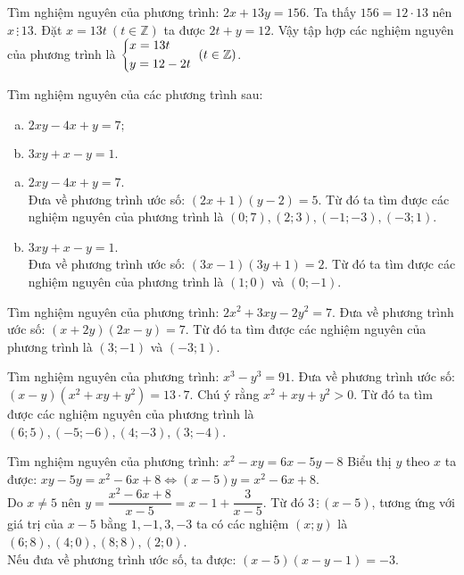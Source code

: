 \begin{bt}
	Tìm nghiệm nguyên của phương trình: $2x+13y = 156$.
	\loigiai
	{
		Ta thấy $156=12 \cdot 13$ nên $x \,\vdots \,13$. Đặt $x = 13t~(t \in \mathbb{Z})$ ta được $2t+y=12$. Vậy tập hợp các nghiệm nguyên của phương trình là $\left\{\begin{aligned}&x=13t \\ &y=12-2t\end{aligned}\right.~(t \in \mathbb{Z})$.
	}
\end{bt}

\begin{bt}
	Tìm nghiệm nguyên của các phương trình sau:
	\begin{multicols}{2}
		\begin{enumerate}[a)]
			\item $2xy-4x+y=7;$
			\item $3xy+x-y=1.$
		\end{enumerate}
	\end{multicols}
	\loigiai 
	{
		\begin{enumerate}[a)]
			\item $2xy-4x+y=7$. \\
			Đưa về phương trình ước số: $(2x+1)(y-2)=5$. Từ đó ta tìm được các nghiệm nguyên của phương trình là $(0;7),(2;3),(-1;-3),(-3;1)$.
			\item $3xy+x-y=1$. \\
			Đưa về phương trình ước số: $(3x-1)(3y+1)=2$. Từ đó ta tìm được các nghiệm nguyên của phương trình là $(1;0)$ và $(0;-1)$.
		\end{enumerate}
	}
\end{bt}

\begin{bt}
	Tìm nghiệm nguyên của phương trình: $2x^2+3xy-2y^2=7$.
	\loigiai 
	{
		Đưa về phương trình ước số: $(x+2y)(2x-y)=7$. Từ đó ta tìm được các nghiệm nguyên của phương trình là $(3;-1)$ và $(-3;1)$.
	}
\end{bt}

\begin{bt}
	Tìm nghiệm nguyên của phương trình: $x^3-y^3=91$.
	\loigiai 
	{
		Đưa về phương trình ước số: $(x-y) \left(x^2+xy+y^2\right) = 13 \cdot 7$. Chú ý rằng $x^2+xy+y^2>0$. Từ đó ta tìm được các nghiệm nguyên của phương trình là $(6;5),(-5;-6),(4;-3),(3;-4)$.
	}
\end{bt}

\begin{bt}
	Tìm nghiệm nguyên của phương trình: $x^2-xy=6x-5y-8$
	\loigiai 
	{
		Biểu thị $y$ theo $x$ ta được: $xy-5y=x^2-6x+8 \Leftrightarrow (x-5)y=x^2-6x+8$. \\
		Do $x \neq 5$ nên $y = \dfrac{x^2-6x+8}{x-5} = x-1+\dfrac{3}{x-5}$. Từ đó $3 \,\vdots\, (x-5)$, tương ứng với giá trị của $x-5$ bằng $1,-1,3,-3$ ta có các nghiệm $(x;y)$ là $(6;8),(4;0),(8;8),(2;0)$. \\
  Nếu đưa về phương trình ước số, ta được: $(x-5)(x-y-1)=-3$.
	}
\end{bt}

